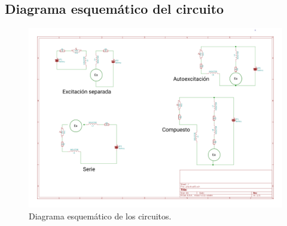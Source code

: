 \subsection{Diagrama esquem\'atico del circuito}

 \begin{figure}[!htbp]
 \caption{Diagrama esquem\'atico de los circuitos.}
 \centering
 \includegraphics [scale=0.35]
 {./img/practica05.png}
 \end{figure}
